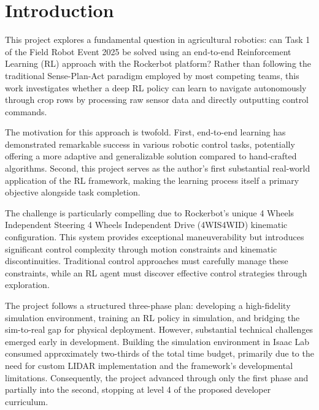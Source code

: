 \documentclass[11pt,a4paper,twocolumn]{article}
\begin{document}




\section{Introduction}
\label{sec:introduction}
This project explores a fundamental question in agricultural robotics: can Task 1 of the Field Robot Event 2025 be solved using an end-to-end Reinforcement Learning (RL) approach with the Rockerbot platform? Rather than following the traditional Sense-Plan-Act paradigm employed by most competing teams, this work investigates whether a deep RL policy can learn to navigate autonomously through crop rows by processing raw sensor data and directly outputting control commands.

The motivation for this approach is twofold. First, end-to-end learning has demonstrated remarkable success in various robotic control tasks, potentially offering a more adaptive and generalizable solution compared to hand-crafted algorithms. Second, this project serves as the author's first substantial real-world application of the RL framework, making the learning process itself a primary objective alongside task completion.

The challenge is particularly compelling due to Rockerbot's unique 4 Wheels Independent Steering 4 Wheels Independent Drive (4WIS4WID) kinematic configuration. This system provides exceptional maneuverability but introduces significant control complexity through motion constraints and kinematic discontinuities. Traditional control approaches must carefully manage these constraints, while an RL agent must discover effective control strategies through exploration.

The project follows a structured three-phase plan: developing a high-fidelity simulation environment, training an RL policy in simulation, and bridging the sim-to-real gap for physical deployment. However, substantial technical challenges emerged early in development. Building the simulation environment in Isaac Lab consumed approximately two-thirds of the total time budget, primarily due to the need for custom LIDAR implementation and the framework's developmental limitations. Consequently, the project advanced through only the first phase and partially into the second, stopping at level 4 of the proposed developer curriculum.
\end{document}
